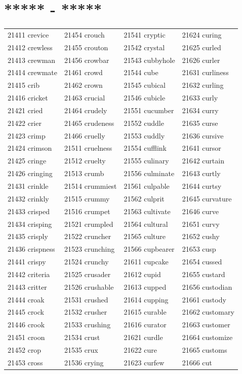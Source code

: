 \documentclass[10pt, oneside]{book}
\begin{document}
\begin{table}
	\centering
	\section*{***** - *****}
	\begin{tabular}{l l l l}
21411 crevice &21454 crouch &21541 cryptic &21624 curing\\
21412 crewless &21455 crouton &21542 crystal &21625 curled\\
21413 crewman &21456 crowbar &21543 cubbyhole &21626 curler\\
21414 crewmate &21461 crowd &21544 cube &21631 curliness\\
21415 crib &21462 crown &21545 cubical &21632 curling\\
21416 cricket &21463 crucial &21546 cubicle &21633 curly\\
21421 cried &21464 crudely &21551 cucumber &21634 curry\\
21422 crier &21465 crudeness &21552 cuddle &21635 curse\\
21423 crimp &21466 cruelly &21553 cuddly &21636 cursive\\
21424 crimson &21511 cruelness &21554 cufflink &21641 cursor\\
21425 cringe &21512 cruelty &21555 culinary &21642 curtain\\
21426 cringing &21513 crumb &21556 culminate &21643 curtly\\
21431 crinkle &21514 crummiest &21561 culpable &21644 curtsy\\
21432 crinkly &21515 crummy &21562 culprit &21645 curvature\\
21433 crisped &21516 crumpet &21563 cultivate &21646 curve\\
21434 crisping &21521 crumpled &21564 cultural &21651 curvy\\
21435 crisply &21522 cruncher &21565 culture &21652 cushy\\
21436 crispness &21523 crunching &21566 cupbearer &21653 cusp\\
21441 crispy &21524 crunchy &21611 cupcake &21654 cussed\\
21442 criteria &21525 crusader &21612 cupid &21655 custard\\
21443 critter &21526 crushable &21613 cupped &21656 custodian\\
21444 croak &21531 crushed &21614 cupping &21661 custody\\
21445 crock &21532 crusher &21615 curable &21662 customary\\
21446 crook &21533 crushing &21616 curator &21663 customer\\
21451 croon &21534 crust &21621 curdle &21664 customize\\
21452 crop &21535 crux &21622 cure &21665 customs\\
21453 cross &21536 crying &21623 curfew &21666 cut\\
	\end{tabular}
 \end{table}
\end{document}
